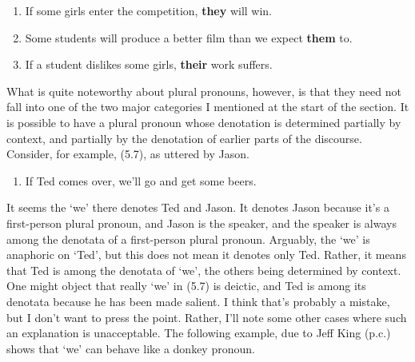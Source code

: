 \documentclass[
  11pt,
  letterpaper,
  DIV=11,
  numbers=noendperiod,
  oneside]{scrartcl}
\providecommand{\tightlist}{%
  \setlength{\itemsep}{0pt}\setlength{\parskip}{0pt}}\usepackage{longtable,booktabs,array}
\begin{document}
\begin{enumerate}
\def\labelenumi{\arabic{enumi}.}
\setcounter{enumi}{3}
\tightlist
\item
  If some girls enter the competition, \textbf{they} will win.
\item
  Some students will produce a better film than we expect \textbf{them}
  to.
\item
  If a student dislikes some girls, \textbf{their} work suffers.
\end{enumerate}

What is quite noteworthy about plural pronouns, however, is that they
need not fall into one of the two major categories I mentioned at the
start of the section. It is possible to have a
plural pronoun whose denotation is determined partially by context, and
partially by the denotation of earlier parts of the discourse. Consider,
for example, (5.7), as uttered by Jason.

\begin{enumerate}
\def\labelenumi{\arabic{enumi}.}
\setcounter{enumi}{6}
\tightlist
\item
  If Ted comes over, we'll go and get some beers.
\end{enumerate}

It seems the `we' there denotes Ted and Jason. It denotes Jason because
it's a first-person plural pronoun, and Jason is the speaker, and the
speaker is always among the denotata of a first-person plural pronoun.
Arguably, the `we' is anaphoric on `Ted', but this does not mean it
denotes only Ted. Rather, it means that Ted is among the denotata of
`we', the others being determined by context. One might object that
really `we' in (5.7) is deictic, and Ted is among its denotata because
he has been made salient. I think that's probably a mistake, but I don't
want to press the point. Rather, I'll note some other cases where such
an explanation is unacceptable. The following example, due to Jeff King
(p.c.) shows that `we' can behave like a donkey pronoun.
\end{document}
